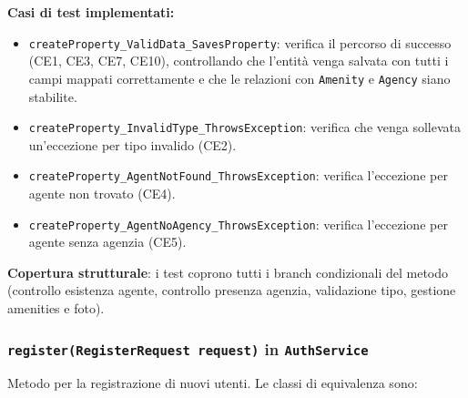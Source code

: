 \documentclass[a4paper,11pt]{report}
\begin{document}
\textbf{Casi di test implementati:}

\begin{itemize}[nosep]
  \item \texttt{createProperty\_ValidData\_SavesProperty}: verifica il percorso di successo (CE1, CE3, CE7, CE10), controllando che l'entità venga salvata con tutti i campi mappati correttamente e che le relazioni con \texttt{Amenity} e \texttt{Agency} siano stabilite.
  \item \texttt{createProperty\_InvalidType\_ThrowsException}: verifica che venga sollevata un'eccezione per tipo invalido (CE2).
  \item \texttt{createProperty\_AgentNotFound\_ThrowsException}: verifica l'eccezione per agente non trovato (CE4).
  \item \texttt{createProperty\_AgentNoAgency\_ThrowsException}: verifica l'eccezione per agente senza agenzia (CE5).
\end{itemize}

\textbf{Copertura strutturale}: i test coprono tutti i branch condizionali del metodo (controllo esistenza agente, controllo presenza agenzia, validazione tipo, gestione amenities e foto).

\subsubsection*{\texttt{register(RegisterRequest request)} in \texttt{AuthService}}

Metodo per la registrazione di nuovi utenti. Le classi di equivalenza sono:
\end{document}
